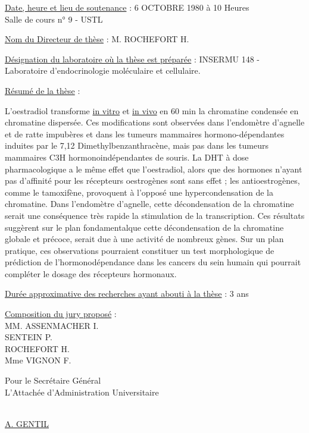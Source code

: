 \uline{Date, heure et lieu de soutenance} : 6 OCTOBRE 1980 à 10 Heures\\
Salle de cours n° 9 - USTL

\uline{Nom du Directeur de thèse} : M. ROCHEFORT H.

\uline{Désignation du laboratoire où la thèse est préparée} : INSERMU 148 - Laboratoire d'endocrinologie moléculaire et cellulaire.

\uline{Résumé de la thèse} :

L'oestradiol transforme \uline{in vitro} et \uline{in vivo} en 60 min la chromatine condensée en chromatine dispersée. Ces modifications sont observées dans l'endomètre d'agnelle et de ratte impubères et dans les tumeurs mammaires hormono-dépendantes induites par le 7,12 Dimethylbenzanthracène, mais pas dans les tumeurs mammaires C3H hormonoindépendantes de souris. La DHT à dose pharmacologique a le même effet que l'oestradiol, alors que des hormones n'ayant pas d'affinité pour les récepteurs oestrogènes sont sans effet ; les antioestrogènes, comme le tamoxifène, provoquent à l'opposé une hypercondensation de la chromatine. Dans l'endomètre d'agnelle, cette décondensation de la chromatine serait une conséquence très rapide la stimulation de la transcription. Ces résultats suggèrent sur le plan fondamental\unsure{:}que cette décondensation de la chromatine globale et précoce, serait due à une activité de nombreux gènes. Sur un plan pratique, ces observations pourraient constituer un test morphologique de prédiction de l'hormonodépendance dans les cancers du sein humain qui pourrait compléter le dosage des récepteurs hormonaux.

\uline{Durée approximative des recherches ayant abouti à la thèse} : 3 ans

\uline{Composition du jury proposé} :\\
MM. ASSENMACHER I.\\
SENTEIN P.\\
ROCHEFORT H.\\
Mme VIGNON F.

Pour le Secrétaire Général\\
L'Attachée d'Administration Universitaire

\uline{}\\
\uline{A. GENTIL}


